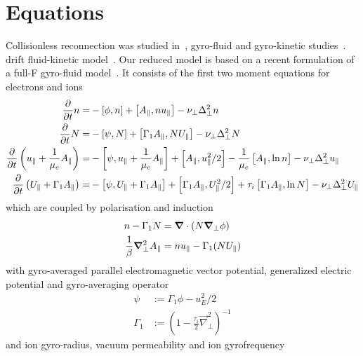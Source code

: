 \section{Equations}
Collisionless reconnection was studied in~\cite{stanier15}, gyro-fluid and gyro-kinetic studies~\cite{comisso13,zacharias14}. drift fluid-kinetic model~\cite{loureiro13}.
Our reduced model is based on a recent formulation of a full-F gyro-fluid model~\cite{Madsen2013}.
It consists of the first two moment equations for electrons and ions
\begin{align}
\frac{\partial}{\partial t} \ne =&
 - \left[\phi, \ne\right]
+ \left[\Apar,\ne \ue  \right]
-\nu_\perp \Delta_\perp^2\ne
\\
\label{firstgyromom}
\frac{\partial}{\partial t} \Ni =&
 - \left[\psi, \Ni\right]
+ \left[\Gamma_1 \Apar ,\Ni \Ui  \right]
-\nu_\perp \Delta_\perp^2\Ni
 \\
\frac{\partial}{\partial t} \left( \ue+ \frac{1}{\mu_e} \Apar \right) =&
      -  \left[ \psi, \ue+ \frac{1}{\mu_e} \Apar  \right]%
    +   \left[\Apar,\ue^2/2   \right]%
      - \frac{1}{\mu_e}  \left[\Apar,\ln{\ne}   \right]
    -\nu_\perp \Delta_\perp^2\ue
      \\
      \frac{\partial}{\partial t} \left( \Ui+ \Gamma_1 \Apar  \right) =&
      -  \left[ \psi, \Ui+ \Gamma_1 \Apar  \right]%
     +   \left[\Gamma_1 \Apar,\Ui^2/2   \right]%
      + \tau_i  \left[\Gamma_1 \Apar,\ln{\Ni}   \right]
    -\nu_\perp \Delta_\perp^2\Ui
\end{align}
which are coupled by polarisation and induction
\begin{align}
 n  - \Gamma_1 N &= {\boldsymbol{\nabla}}\cdot\left(N {\boldsymbol{\nabla}}_\perp \phi\right) \\
 \frac{1}{\beta} {\boldsymbol{\nabla}}_\perp^2 A_\parallel &=  n  u_\parallel - \Gamma_1 (N U_\parallel)
\end{align}
with gyro-averaged parallel electromagnetic vector potential, generalized electric potential and gyro-averaging operator
\begin{align}
 \psi &:= \Gamma_1 \phi - u_E^2 /2  \\
  \Gamma_1 &:= (1-\frac{\tau_i}{2} \vec{\nabla}_\perp^2 )^{-1} 
\end{align}
and ion gyro-radius, vacuum permeability and ion gyrofrequency

